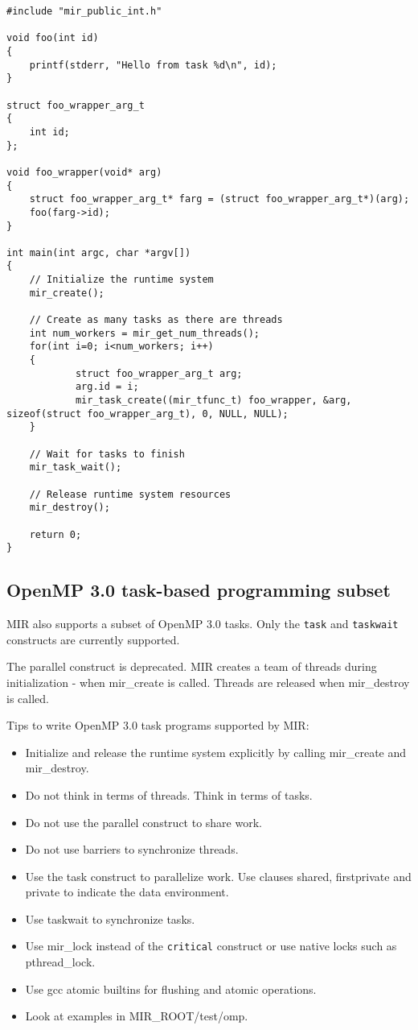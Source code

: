 \documentclass[11pt,a4paper,notitlepage]{article}
\begin{document}
\begin{lstlisting}[style=BashInputStyle]
#include "mir_public_int.h"

void foo(int id)
{
    printf(stderr, "Hello from task %d\n", id);
}

struct foo_wrapper_arg_t 
{
    int id;
};

void foo_wrapper(void* arg)
{
    struct foo_wrapper_arg_t* farg = (struct foo_wrapper_arg_t*)(arg);
    foo(farg->id);
}

int main(int argc, char *argv[])
{
    // Initialize the runtime system
    mir_create();

    // Create as many tasks as there are threads
    int num_workers = mir_get_num_threads();
    for(int i=0; i<num_workers; i++)
    {
            struct foo_wrapper_arg_t arg;
            arg.id = i;
            mir_task_create((mir_tfunc_t) foo_wrapper, &arg, sizeof(struct foo_wrapper_arg_t), 0, NULL, NULL);
    }
        
    // Wait for tasks to finish
    mir_task_wait();

    // Release runtime system resources
    mir_destroy();

    return 0;
}
\end{lstlisting}

\subsection{OpenMP 3.0 task-based programming subset}
MIR also supports a subset of OpenMP 3.0 tasks. 
Only the \texttt{task} and \texttt{taskwait} constructs are currently supported.

The parallel construct is deprecated.
MIR creates a team of threads during initialization - when mir\_create is called.
Threads are released when mir\_destroy is called.

Tips to write OpenMP 3.0 task programs supported by MIR:
\begin{itemize}
\item Initialize and release the runtime system explicitly by calling mir\_create and mir\_destroy.
\item Do not think in terms of threads. Think in terms of tasks.
\item Do not use the parallel construct to share work. 
\item Do not use barriers to synchronize threads.
\item Use the task construct to parallelize work. Use clauses shared, firstprivate and private to indicate the data environment.
\item Use taskwait to synchronize tasks.
\item Use mir\_lock instead of the \texttt{critical} construct or use native locks such as pthread\_lock.
\item Use gcc atomic builtins for flushing and atomic operations.
\item Look at examples in MIR\_ROOT/test/omp.
\end{itemize}
\end{document}
